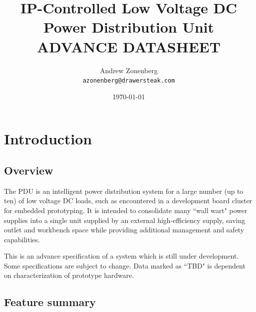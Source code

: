 \documentclass{article}
\begin{document}
\title{IP-Controlled Low Voltage DC\\Power Distribution Unit\\ADVANCE DATASHEET}
\author{Andrew Zonenberg\\
	\texttt{azonenberg@drawersteak.com}}
\date{\today}
\maketitle

\pagestyle{fancy}

\setcounter{tocdepth}{2}
\tableofcontents

\pagebreak
\section{Introduction}

\subsection{Overview}
The PDU is an intelligent power distribution system for a large number (up to ten) of low voltage DC loads, such as 
encountered in a development board cluster for embedded prototyping. It is intended to consolidate many ``wall wart" 
power supplies into a single unit supplied by an external high-efficiency supply, saving outlet and workbench space 
while providing additional management and safety capabilities.

This is an advance specification of a system which is still under development. Some specifications are subject to 
change. Data marked as ``TBD" is dependent on characterization of prototype hardware.

\subsection{Feature summary}
\end{document}
